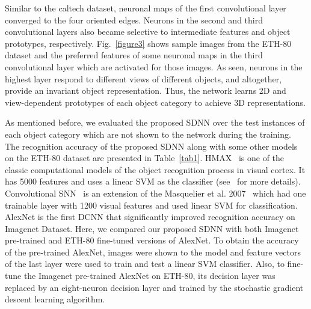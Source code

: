 \documentclass[preprint,5p,12pt,twocolumn]{article}
\begin{document}
Similar to the caltech dataset, neuronal maps of the first convolutional layer converged to the four oriented edges. Neurons in the second and third convolutional layers also became selective to intermediate features and object prototypes, respectively. Fig.~\ref{figure3}  shows sample images from the ETH-80 dataset and the preferred features of some neuronal maps in the  third convolutional layer which are activated for those images. As seen, neurons in the highest layer respond to different views of different objects, and altogether, provide an invariant object representation. Thus, the network learns  2D and view-dependent prototypes of each object category to achieve 3D representations.


As mentioned before, we evaluated the proposed SDNN over the test instances of each object category which are not shown to the network during the training. The recognition accuracy of the proposed SDNN along with some other models on the ETH-80 dataset are presented in Table~\ref{tab1}. HMAX~\cite{serre2007feedforward} is one of the classic computational models of the object recognition process in visual cortex. It has 5000 features and uses a linear SVM as the classifier (see~\cite{kheradpisheh2016bio} for more details). Convolutional SNN~\cite{kheradpisheh2016bio} is an extension of the Masquelier et al. 2007~\cite{masquelier2007unsupervised} which had  one trainable layer with 1200 visual features and used linear SVM for classification. AlexNet is the first DCNN that significantly improved recognition accuracy on Imagenet Dataset. Here, we compared our proposed SDNN with both Imagenet pre-trained and ETH-80 fine-tuned versions of AlexNet. To obtain the accuracy of the pre-trained AlexNet, images were shown to the model and feature vectors of the last layer were used to train and test a linear SVM classifier. Also, to fine-tune the Imagenet pre-trained AlexNet on ETH-80, its decision layer was replaced by an eight-neuron decision layer and trained by the stochastic gradient descent learning algorithm. 
\end{document}
